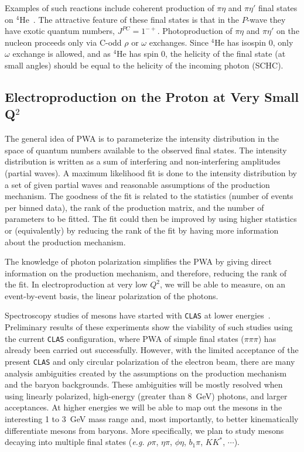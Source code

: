 Examples of such reactions include coherent production of $\pi \eta$ and
$\pi \eta'$ final states on $^4$He~\cite{stephe4}.  The attractive
feature of these final states is that in the $P$-wave they have
exotic quantum numbers, $J^{PC}=1^{-+}$. Photoproduction of $\pi \eta$
and $\pi \eta'$ on the nucleon proceeds only via C-odd $\rho$ or
$\omega$ exchanges. Since $^4$He has isospin 0, only $\omega$ exchange
is allowed, and as $^4$He has spin 0, the helicity of the final state
(at small angles) should be equal to the helicity of the incoming photon 
(SCHC).

\subsection{Electroproduction on the Proton at Very Small Q$^2$} 

The general idea of PWA is to parameterize the intensity distribution
in the space of quantum numbers available to the observed final
states. The intensity distribution is written as a sum of interfering
and non-interfering amplitudes (partial waves). A maximum likelihood
fit is done to the intensity distribution by a set of given partial
waves and reasonable assumptions of the production mechanism.  The
goodness of the fit is related to the statistics (number of events per
binned data), the rank of the production matrix, and the number of
parameters to be fitted. The fit could then be improved by using
higher statistics or (equivalently) by reducing the rank of the fit by
having more information about the production mechanism.

The knowledge of photon polarization simplifies the PWA by giving
direct information on the production mechanism, and therefore, reducing
the rank of the fit. In electroproduction at very low $Q^2$, we will
be able to measure, on an event-by-event basis, the linear polarization
of the photons.

Spectroscopy studies of mesons have started with {\tt CLAS} at lower 
energies~\cite{Ad01}.  Preliminary results of these experiments show the 
viability of such studies using the current {\tt CLAS} configuration, 
where PWA of simple final states ($\pi\pi\pi$) has already been carried 
out successfully.  However, with the limited acceptance of the present 
{\tt CLAS} and only circular polarization of the electron beam, there are 
many analysis ambiguities created by the assumptions on the production 
mechanism and the baryon backgrounds. These ambiguities will be mostly 
resolved when using linearly polarized, high-energy (greater than 8~GeV) 
photons, and larger acceptances. At higher energies we will be able to map 
out the mesons in the interesting 1 to 3~GeV mass range and, most 
importantly, to better kinematically differentiate mesons from baryons. More
specifically, we plan to study mesons decaying into multiple final states 
({\it e.g.} $\rho \pi$, $\eta \pi$, $\phi \eta$, $b_1 \pi$, $KK^*$, $\cdots$).

